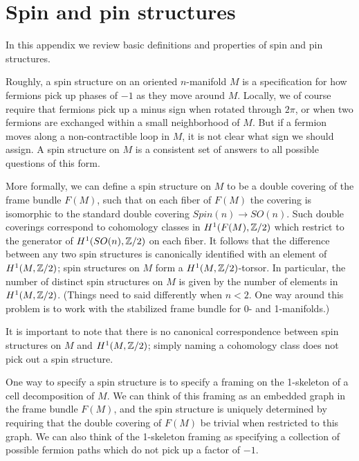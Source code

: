 

\section{Spin and pin structures} \label{spin_and_pin}

%
In this appendix we review basic definitions and properties of spin and pin structures.

\medskip

Roughly, a spin structure on an oriented $n$-manifold $M$ is a specification for how fermions pick up phases of $-1$ as they move around $M$.
Locally, we of course require that fermions pick up a minus sign when rotated through $2\pi$,
or when two fermions are exchanged within a small neighborhood of $M$.
But if a fermion moves along a non-contractible loop in $M$, it is not clear what sign we should assign.
A spin structure on $M$ is a consistent set of answers to all possible questions of this form.

More formally, we can define a spin structure on $M$ to be a double covering of the frame bundle $F(M)$, such that on each fiber of $F(M)$
the covering is isomorphic to the standard double covering $Spin(n) \to SO(n)$.
Such double coverings correspond to cohomology classes in $H^1(F(M), \mathbb{Z}/2)$ which restrict to the generator of $H^1(SO(n), \mathbb{Z}/2)$ on each fiber.
It follows that the difference between any two spin structures is canonically identified
with an element of $H^1(M, \mathbb{Z}/2)$; spin structures on $M$ form a $H^1(M, \mathbb{Z}/2)$-torsor.
In particular, the number of distinct spin structures on $M$ is given by the number of elements in $H^1(M, \mathbb{Z}/2)$.
(Things need to said differently when $n<2$.
One way around this problem is to work with the stabilized frame bundle for 0- and 1-manifolds.)

It is important to note that there is no canonical correspondence between spin structures on $M$ and $H^1(M, \mathbb{Z}/2)$; simply naming
a cohomology class does not pick out a spin structure.

One way to specify a spin structure is to specify a framing on the 1-skeleton of a cell decomposition of $M$.
We can think of this framing as an embedded graph in the frame bundle $F(M)$, and the spin structure is uniquely determined by requiring
that the double covering of $F(M)$ be trivial when restricted to this graph.
We can also think of the 1-skeleton framing as specifying a collection of possible fermion paths which do not pick up a factor of $-1$.

